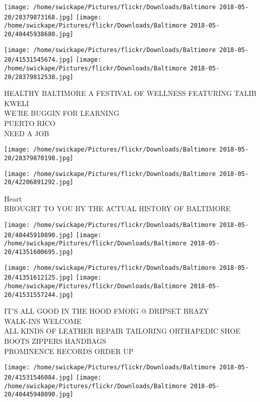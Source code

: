 \documentclass[10pt,letterpaper]{article}
\begin{document}
\texttt{[image: /home/swickape/Pictures/flickr/Downloads/Baltimore 2018-05-20/28379873168.jpg]}
\texttt{[image: /home/swickape/Pictures/flickr/Downloads/Baltimore 2018-05-20/40445938680.jpg]}

\texttt{[image: /home/swickape/Pictures/flickr/Downloads/Baltimore 2018-05-20/41531545674.jpg]}
\texttt{[image: /home/swickape/Pictures/flickr/Downloads/Baltimore 2018-05-20/28379812538.jpg]}

HEALTHY BALTIMORE A FESTIVAL OF WELLNESS FEATURING TALIB KWELI\\
WE'RE BUGGIN FOR LEARNING\\
PUERTO RICO\\
NEED A JOB\\
\pagebreak

\texttt{[image: /home/swickape/Pictures/flickr/Downloads/Baltimore 2018-05-20/28379870198.jpg]}

\vspace{0.25in}
\texttt{[image: /home/swickape/Pictures/flickr/Downloads/Baltimore 2018-05-20/42206891292.jpg]}

Heart\\
BROUGHT TO YOU BY THE ACTUAL HISTORY OF BALTIMORE\\
\pagebreak

\texttt{[image: /home/swickape/Pictures/flickr/Downloads/Baltimore 2018-05-20/40445910890.jpg]}
\texttt{[image: /home/swickape/Pictures/flickr/Downloads/Baltimore 2018-05-20/41351600695.jpg]}

\texttt{[image: /home/swickape/Pictures/flickr/Downloads/Baltimore 2018-05-20/41351612125.jpg]}
\texttt{[image: /home/swickape/Pictures/flickr/Downloads/Baltimore 2018-05-20/41531557244.jpg]}

IT'S ALL GOOD IN THE HOOD FMOIG @ DRIPSET BRAZY\\
WALK{-}INS WELCOME\\
ALL KINDS OF LEATHER REPAIR TAILORING ORTHAPEDIC  SHOE BOOTS ZIPPERS HANDBAGS\\
PROMINENCE RECORDS ORDER UP\\
\pagebreak

\texttt{[image: /home/swickape/Pictures/flickr/Downloads/Baltimore 2018-05-20/41531546084.jpg]}
\texttt{[image: /home/swickape/Pictures/flickr/Downloads/Baltimore 2018-05-20/40445948090.jpg]}
\end{document}
